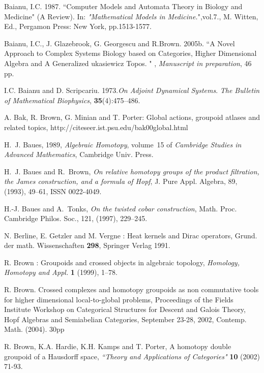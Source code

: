 \documentclass[12pt]{article}
\theoremstyle{plain}
\theoremstyle{definition}
\numberwithin{equation}{section}
\begin{document}
\begin{thebibliography}{99}
Baianu, I.C. 1987. ``Computer Models and Automata Theory in Biology and Medicine" (A Review). 
In: \emph{"Mathematical Models in Medicine.}",vol.7., M. Witten, Ed., Pergamon Press: New 
York, pp.1513-1577.

Baianu, I.C., J. Glazebrook, G. Georgescu and R.Brown. 2005b. ``A Novel Approach to Complex
Systems Biology based on Categories, Higher Dimensional Algebra and A Generalized
\Textsl{\L}ukasiewicz Topos. " , \emph{Manuscript in preparation}, 46 pp.

I.C. Baianu and D. Scripcariu. 1973.\emph{On Adjoint Dynamical Systems}. \emph{The Bulletin of %
Mathematical Biophysics}, \textbf{35}(4):475--486.

A. Bak, R. Brown, G. Minian and T. Porter: Global actions, groupoid atlases and related 
topics, http://citeseer.ist.psu.edu/bak00global.html


H.~J. Baues, 1989, {\em Algebraic Homotopy\/}, volume~15 of {\em Cambridge  Studies in Advanced Mathematics},
 Cambridge Univ. Press.

H.~J. Baues and R.~Brown, {\em On relative homotopy groups of the
product filtration, the {J}ames construction, and a formula of {H}opf\/}, J. Pure
  Appl. Algebra, 89, (1993), 49--61, ISSN 0022-4049.

H.-J. Baues and A.~Tonks, {\em On the twisted cobar construction}, 
Math.  Proc. Cambridge Philos. Soc., 121, (1997), 229--245.

N. Berline, E. Getzler and M. Vergne : Heat kernels and Dirac
operators, Grund. der math. Wissenschaften \textbf{298}, Springer
Verlag 1991.

R. Brown : Groupoids and crossed objects in algebraic topology,
\emph{Homology, Homotopy and Appl.} \textbf{1} (1999), 1--78.

R. Brown. Crossed complexes and homotopy groupoids as non commutative tools for higher 
dimensional local-to-global problems, Proceedings of the Fields Institute Workshop on 
Categorical Structures for Descent and Galois Theory, Hopf Algebras and Semiabelian 
Categories, September 23-28, 2002, Contemp. Math. (2004). 30pp  


R. Brown, K.A. Hardie, K.H. Kamps  and T. Porter, A homotopy double groupoid of a Hausdorff 
space, {\em ``Theory and Applications of Categories"} \textbf{10} (2002) 71-93.


\end{thebibliography}
\end{document}

